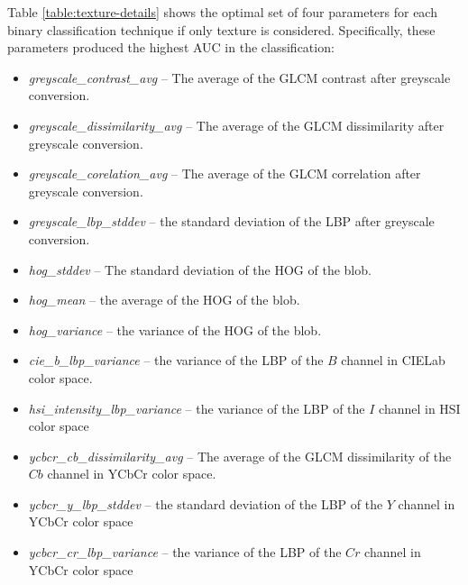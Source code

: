 \documentclass[letterpaper, notitlepage]{report}
\begin{document}
{
\begin{small}
\renewcommand{\arraystretch}{1.2}




\end{small}
}
Table \ref{table:texture-details} shows the optimal set of four parameters for each binary classification technique if only texture is considered. Specifically, these parameters produced the highest AUC in the classification:
\begin{itemize}
	\item{\textit{greyscale\_contrast\_avg} -- The average of the GLCM contrast after greyscale conversion.}
	\item{\textit{greyscale\_dissimilarity\_avg} -- The average of the GLCM dissimilarity after greyscale conversion.}
	\item{\textit{greyscale\_corelation\_avg} -- The average of the GLCM correlation after greyscale conversion.}
	\item{\textit{greyscale\_lbp\_stddev} -- the standard deviation of the LBP after greyscale conversion.}
	\item{\textit{hog\_stddev} -- The standard deviation of the HOG of the blob.}
	\item{\textit{hog\_mean} -- the average of the HOG of the blob.}
	\item{\textit{hog\_variance} -- the variance of the HOG of the blob.}
	\item{\textit{cie\_b\_lbp\_variance} -- the variance of the LBP of the $B$ channel in CIELab color space.}
	\item{\textit{hsi\_intensity\_lbp\_variance} -- the variance of the LBP of the $I$ channel in HSI color space}
	\item{\textit{ycbcr\_cb\_dissimilarity\_avg} -- The average of the GLCM dissimilarity of the $Cb$ channel in YCbCr color space.}
	\item{\textit{ycbcr\_y\_lbp\_stddev} -- the standard deviation of the LBP of the $Y$ channel in YCbCr color space}
	\item{\textit{ycbcr\_cr\_lbp\_variance} -- the variance of the LBP of the $Cr$ channel in YCbCr color space}	
\end{itemize}


\end{document}
